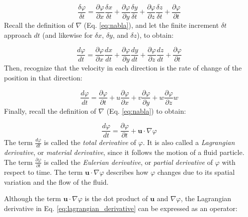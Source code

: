 \documentclass[12pt]{article}
\numberwithin{equation}{section}
\numberwithin{figure}{section}
\numberwithin{table}{section}
\begin{document}
\begin{equation}
  \frac{\delta\varphi}{\delta t} = \frac{\partial \varphi}{\partial x} \frac{\delta x}{\delta t} +
    \frac{\partial \varphi}{\partial y} \frac{\delta y}{\delta t} +
    \frac{\partial \varphi}{\partial z} \frac{\delta z}{\delta t} +
    \frac{\partial \varphi}{\partial t}
\end{equation}
Recall the definition of $\nabla$ (Eq. \ref{eq:nabla}), and let the finite
increment $\delta t$ approach $dt$ (and likewise for $\delta x$, $\delta y$, and
$\delta z$), to obtain:

\begin{equation}
  \frac{d\varphi}{dt} = \frac{\partial \varphi}{\partial x} \frac{dx}{dt} +
    \frac{\partial \varphi}{\partial y} \frac{dy}{dt} +
    \frac{\partial \varphi}{\partial z} \frac{dz}{dt} +
    \frac{\partial \varphi}{\partial t}
\end{equation}
Then, recognize that the velocity in each direction is the rate of change of
the position in that direction:

\begin{equation}
  \frac{d\varphi}{dt} =
    \frac{\partial \varphi}{\partial t} +
    u \frac{\partial \varphi}{\partial x} +
    v \frac{\partial \varphi}{\partial y} +
    w \frac{\partial \varphi}{\partial z} w
\end{equation}
Finally, recall the definition of $\nabla$ (Eq. \ref{eq:nabla}) to obtain:

\begin{equation}
  \label{eq:lagrangian_derivative}
  \frac{d\varphi}{dt} = \frac{\partial \varphi}{\partial t} + \mathbf{u} \cdot \nabla \varphi
\end{equation}
The term $\frac{d\varphi}{dt}$ is called the \textit{total derivative}
of $\varphi$. It is also called a \textit{Lagrangian derivative},
or \textit{material derivative}, since it follows
the motion of a fluid particle.
The term $\frac{\partial \varphi}{\partial t}$ is called the
\textit{Eulerian derivative},
or \textit{partial derivative}
of $\varphi$ with respect to time.
The term $\mathbf{u} \cdot \nabla \varphi$ describes how $\varphi$ changes due
to its spatial variation and the flow of the fluid.

Although the term $\mathbf{u} \cdot \nabla \varphi$ is the dot product of
$\mathbf{u}$ and $\nabla \varphi$, the Lagrangian derivative in Eq.
\ref{eq:lagrangian_derivative} can be expressed as an operator:
\end{document}

